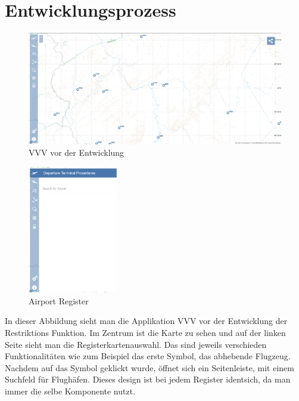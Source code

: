 \documentclass[a4paper,12pt]{article}
\begin{document}
\section{Entwicklungsprozess}
\begin{figure}[H]
    \centering
        \includegraphics[width=1\textwidth]{images/VVVVorEntwicklung.png}
\caption{VVV vor der Entwicklung}
\end{figure}
\begin{figure}
    \centering
    \includegraphics[width=0.35\textwidth]{images/AirportTab.png}
    \caption{Airport Register}
\end{figure}
In dieser Abbildung sieht man die Applikation VVV vor der Entwicklung der Restriktions Funktion. Im Zentrum ist die Karte zu sehen und auf der linken Seite sieht man die Registerkartenauswahl. Das sind jeweils verschieden Funktionalitäten wie zum Beispiel das erste Symbol, das abhebende Flugzeug. Nachdem auf das Symbol geklickt wurde, öffnet sich ein Seitenleiste, mit einem Suchfeld für Flughäfen. Dieses design ist bei jedem Register identsich, da man immer die selbe Komponente nutzt. 
\\\\\\
\end{document}
